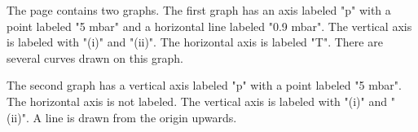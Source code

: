 The page contains two graphs. The first graph has an axis labeled "p" with a point labeled "5 mbar" and a horizontal line labeled "0.9 mbar". The vertical axis is labeled with "(i)" and "(ii)". The horizontal axis is labeled "T". There are several curves drawn on this graph.

The second graph has a vertical axis labeled "p" with a point labeled "5 mbar". The horizontal axis is not labeled. The vertical axis is labeled with "(i)" and "(ii)". A line is drawn from the origin upwards.